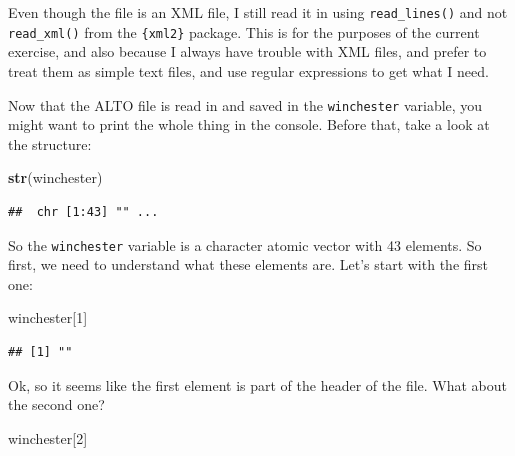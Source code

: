 \documentclass[]{gitbook}
\newenvironment{Shaded}{\begin{snugshade}}{\end{snugshade}}
\newcommand{\DecValTok}[1]{\textcolor[rgb]{0.00,0.00,0.81}{#1}}
\newcommand{\KeywordTok}[1]{\textcolor[rgb]{0.13,0.29,0.53}{\textbf{#1}}}
\newcommand{\NormalTok}[1]{#1}
\begin{document}
Even though the file is an XML file, I still read it in using \texttt{read\_lines()} and not \texttt{read\_xml()}
from the \texttt{\{xml2\}} package. This is for the purposes of the current exercise, and also because I
always have trouble with XML files, and prefer to treat them as simple text files, and use regular
expressions to get what I need.

Now that the ALTO file is read in and saved in the \texttt{winchester} variable, you might want to print
the whole thing in the console. Before that, take a look at the structure:

\begin{Shaded}
\begin{Highlighting}[]
\KeywordTok{str}\NormalTok{(winchester)}
\end{Highlighting}
\end{Shaded}

\begin{verbatim}
##  chr [1:43] "" ...
\end{verbatim}

So the \texttt{winchester} variable is a character atomic vector with 43 elements. So first, we need to
understand what these elements are. Let's start with the first one:

\begin{Shaded}
\begin{Highlighting}[]
\NormalTok{winchester[}\DecValTok{1}\NormalTok{]}
\end{Highlighting}
\end{Shaded}

\begin{verbatim}
## [1] ""
\end{verbatim}

Ok, so it seems like the first element is part of the header of the file. What about the second one?

\begin{Shaded}
\begin{Highlighting}[]
\NormalTok{winchester[}\DecValTok{2}\NormalTok{]}
\end{Highlighting}
\end{Shaded}
\end{document}
